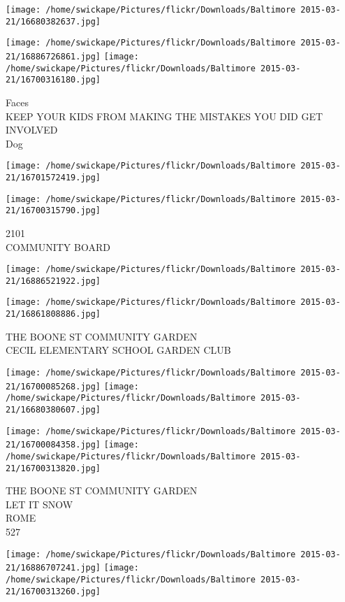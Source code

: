 \documentclass[10pt,letterpaper]{article}
\begin{document}
\texttt{[image: /home/swickape/Pictures/flickr/Downloads/Baltimore 2015-03-21/16680382637.jpg]}

\vspace{0.25in}
\texttt{[image: /home/swickape/Pictures/flickr/Downloads/Baltimore 2015-03-21/16886726861.jpg]}
\texttt{[image: /home/swickape/Pictures/flickr/Downloads/Baltimore 2015-03-21/16700316180.jpg]}

Faces\\
KEEP YOUR KIDS FROM MAKING THE MISTAKES YOU DID GET INVOLVED\\
Dog
\pagebreak

\texttt{[image: /home/swickape/Pictures/flickr/Downloads/Baltimore 2015-03-21/16701572419.jpg]}

\vspace{0.25in}
\texttt{[image: /home/swickape/Pictures/flickr/Downloads/Baltimore 2015-03-21/16700315790.jpg]}

2101\\
COMMUNITY BOARD
\pagebreak

\texttt{[image: /home/swickape/Pictures/flickr/Downloads/Baltimore 2015-03-21/16886521922.jpg]}

\vspace{0.25in}
\texttt{[image: /home/swickape/Pictures/flickr/Downloads/Baltimore 2015-03-21/16861808886.jpg]}

THE BOONE ST COMMUNITY GARDEN\\
CECIL ELEMENTARY SCHOOL GARDEN CLUB
\pagebreak

\texttt{[image: /home/swickape/Pictures/flickr/Downloads/Baltimore 2015-03-21/16700085268.jpg]}
\texttt{[image: /home/swickape/Pictures/flickr/Downloads/Baltimore 2015-03-21/16680380607.jpg]}

\texttt{[image: /home/swickape/Pictures/flickr/Downloads/Baltimore 2015-03-21/16700084358.jpg]}
\texttt{[image: /home/swickape/Pictures/flickr/Downloads/Baltimore 2015-03-21/16700313820.jpg]}

THE BOONE ST COMMUNITY GARDEN\\
LET IT SNOW\\
ROME\\
527
\pagebreak

\texttt{[image: /home/swickape/Pictures/flickr/Downloads/Baltimore 2015-03-21/16886707241.jpg]}
\texttt{[image: /home/swickape/Pictures/flickr/Downloads/Baltimore 2015-03-21/16700313260.jpg]}
\end{document}

